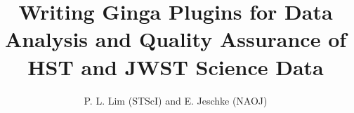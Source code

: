 \documentclass[]{article}
\def\mypaperwidth{27.83in} \def\mypaperheight{39.37in}     %
\def\mydblmargin{\dimen87}
\begin{document}
\setlength{\textwidth}{\mypaperwidth-\mydblmargin}
\setlength{\textheight}{\mypaperheight-\mydblmargin}

\setlength{\hoffset}{-1.0in}
\setlength{\voffset}{-1.0in}

\setlength{\marginparwidth}{0in}
\setlength{\marginparsep}{0in}

\setlength{\footskip}{1em}

\setlength\headheight{0in}
\setlength\headsep{1em}

\setlength{\topmargin}{0.0in}
\setlength{\oddsidemargin}{1in}
\setlength{\evensidemargin}{1in}

\newcommand{\para}{\vspace*{1em}}

\title{Writing Ginga Plugins for Data Analysis and Quality Assurance of
            HST and JWST Science Data}
\author{P. L. Lim (STScI) and E. Jeschke (NAOJ)}

\setlength{\parindent}{0in}
\setlength{\parskip}{0pt}

\raggedright


\pagestyle{empty}
\end{document}
